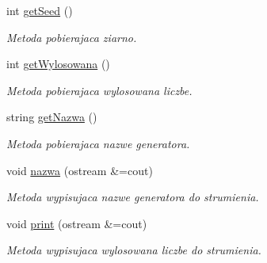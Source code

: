 \begin{DoxyCompactItemize}
int \hyperlink{classGenerator_a633199af5cd153df7a76ddc4b64d752a}{get\+Seed} ()
\begin{DoxyCompactList}\small\item\em Metoda pobierajaca ziarno. \end{DoxyCompactList}\item 
int \hyperlink{classGenerator_aae4ac93fb2d5b73af6fd7fd303d2d94e}{get\+Wylosowana} ()
\begin{DoxyCompactList}\small\item\em Metoda pobierajaca wylosowana liczbe. \end{DoxyCompactList}\item 
string \hyperlink{classGenerator_a15bb85903497555e680e8e8eb0bb22d5}{get\+Nazwa} ()
\begin{DoxyCompactList}\small\item\em Metoda pobierajaca nazwe generatora. \end{DoxyCompactList}\item 
void \hyperlink{classGenerator_a8a224021c828a19866198cf1ee56584f}{nazwa} (ostream \&=cout)
\begin{DoxyCompactList}\small\item\em Metoda wypisujaca nazwe generatora do strumienia. \end{DoxyCompactList}\item 
void \hyperlink{classGenerator_ac62e20399a0509a683ac9a9aad47a9d9}{print} (ostream \&=cout)
\begin{DoxyCompactList}\small\item\em Metoda wypisujaca wylosowana liczbe do strumienia. \end{DoxyCompactList}\end{DoxyCompactItemize}
